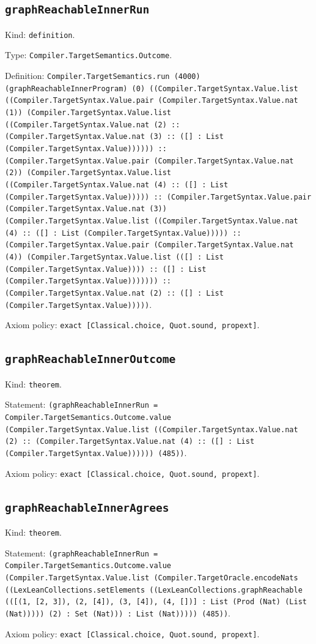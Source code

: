 \documentclass[11pt]{article}
\begin{document}
\subsection*{\texttt{graphReachableInnerRun}}
\noindent Kind: \texttt{definition}.\par
\noindent Type: \texttt{Compiler.TargetSemantics.Outcome}.\par
\noindent Definition: \texttt{Compiler.TargetSemantics.run (4000) (graphReachableInnerProgram) (0) ((Compiler.TargetSyntax.Value.list ((Compiler.TargetSyntax.Value.pair (Compiler.TargetSyntax.Value.nat (1)) (Compiler.TargetSyntax.Value.list ((Compiler.TargetSyntax.Value.nat (2) :: (Compiler.TargetSyntax.Value.nat (3) :: ([] : List (Compiler.TargetSyntax.Value)))))) :: (Compiler.TargetSyntax.Value.pair (Compiler.TargetSyntax.Value.nat (2)) (Compiler.TargetSyntax.Value.list ((Compiler.TargetSyntax.Value.nat (4) :: ([] : List (Compiler.TargetSyntax.Value))))) :: (Compiler.TargetSyntax.Value.pair (Compiler.TargetSyntax.Value.nat (3)) (Compiler.TargetSyntax.Value.list ((Compiler.TargetSyntax.Value.nat (4) :: ([] : List (Compiler.TargetSyntax.Value))))) :: (Compiler.TargetSyntax.Value.pair (Compiler.TargetSyntax.Value.nat (4)) (Compiler.TargetSyntax.Value.list (([] : List (Compiler.TargetSyntax.Value)))) :: ([] : List (Compiler.TargetSyntax.Value))))))) :: (Compiler.TargetSyntax.Value.nat (2) :: ([] : List (Compiler.TargetSyntax.Value)))))}.\par
\noindent Axiom policy: \texttt{exact [Classical.choice, Quot.sound, propext]}.\par
\subsection*{\texttt{graphReachableInnerOutcome}}
\noindent Kind: \texttt{theorem}.\par
\noindent Statement: \texttt{(graphReachableInnerRun = Compiler.TargetSemantics.Outcome.value (Compiler.TargetSyntax.Value.list ((Compiler.TargetSyntax.Value.nat (2) :: (Compiler.TargetSyntax.Value.nat (4) :: ([] : List (Compiler.TargetSyntax.Value)))))) (485))}.\par
\noindent Axiom policy: \texttt{exact [Classical.choice, Quot.sound, propext]}.\par
\subsection*{\texttt{graphReachableInnerAgrees}}
\noindent Kind: \texttt{theorem}.\par
\noindent Statement: \texttt{(graphReachableInnerRun = Compiler.TargetSemantics.Outcome.value (Compiler.TargetSyntax.Value.list (Compiler.TargetOracle.encodeNats ((LexLeanCollections.setElements ((LexLeanCollections.graphReachable (([(1, [2, 3]), (2, [4]), (3, [4]), (4, [])] : List (Prod (Nat) (List (Nat))))) (2) : Set (Nat))) : List (Nat))))) (485))}.\par
\noindent Axiom policy: \texttt{exact [Classical.choice, Quot.sound, propext]}.\par
\end{document}
